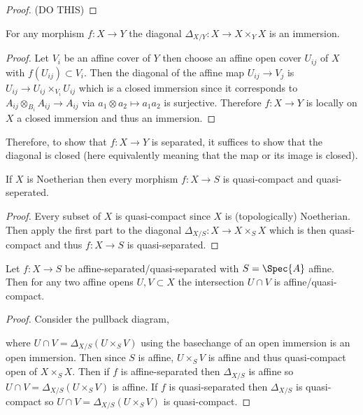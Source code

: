 \documentclass[12pt]{article}
\begin{document}
\begin{proof}
(DO THIS)
\end{proof}

\begin{lemma}
For any morphism $f : X \to Y$ the diagonal $\Delta_{X / Y} : X \to X \times_Y X$ is an immersion.
\end{lemma}

\begin{proof}
Let $V_i$ be an affine cover of $Y$ then choose an affine open cover $U_{ij}$ of $X$ with $f(U_{ij}) \subset V_i$. Then the diagonal of the affine map $U_{ij} \to V_j$ is $U_{ij} \to U_{ij} \times_{V_i} U_{ij}$ which is a closed immersion since it corresponds to $A_{ij} \otimes_{B_i} A_{ij} \to A_{ij}$ via $a_1 \otimes a_2 \mapsto a_1 a_2$ is surjective. Therefore $f : X \to Y$ is locally on $X$ a closed immersion and thus an immersion. 
\end{proof}

\begin{rmk}
Therefore, to show that $f : X \to Y$ is separated, it suffices to show that the diagonal is closed (here equivalently meaning that the map or its image is closed). 
\end{rmk}

\begin{lemma}
If $X$ is Noetherian then every morphism $f : X \to S$ is quasi-compact and quasi-seperated. 
\end{lemma}

\begin{proof}
Every subset of $X$ is quasi-compact since $X$ is (topologically) Noetherian. Then apply the first part to the diagonal $\Delta_{X/S} : X \to X \times_S X$ which is then quasi-compact and thus $f : X \to S$ is quasi-separated.
\end{proof}

\begin{lemma}
Let $f : X \to S$ be affine-separated/quasi-separated with $S = \Spec{A}$ affine. Then for any two affine opens $U, V \subset X$ the intersection $U \cap V$ is affine/quasi-compact. 
\end{lemma}

\begin{proof}
Consider the pullback diagram,
\begin{center}
\end{center}
where $U \cap V = \Delta_{X/S}(U \times_S V)$ using the basechange of an open immersion is an open immersion. Then since $S$ is affine, $U \times_S V$ is affine and thus quasi-compact open of $X \times_S X$. Then if $f$ is affine-separated then $\Delta_{X/S}$ is affine so $U \cap V = \Delta_{X/S}(U \times_S V)$ is affine. If $f$ is quasi-separated then $\Delta_{X/S}$ is quasi-compact so $U \cap V = \Delta_{X/S}(U \times_S V)$ is quasi-compact.
\end{proof}
\end{document}
